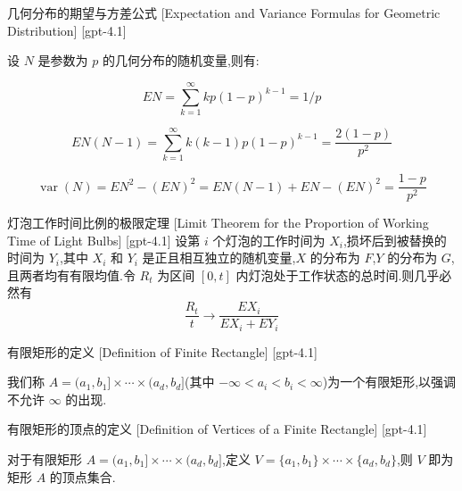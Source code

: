 \documentclass[UTF8]{ctexart}
\begin{document}
    \begin{ppt}
        {几何分布的期望与方差公式}
        [Expectation and Variance Formulas for Geometric Distribution]
        [gpt-4.1]
        
设 $N$ 是参数为 $p$ 的几何分布的随机变量,则有:

\[
E N = \sum_{k = 1}^{\infty} k p (1 - p)^{k - 1} = 1 / p
\]

\[
E N (N - 1) = \sum_{k = 1}^{\infty} k (k - 1) p (1 - p)^{k - 1} = \frac{2 (1 - p)}{p^{2}}
\]

\[
\operatorname{var}(N) = E N^{2} - (E N)^{2} = E N (N - 1) + E N - (E N)^{2} = \frac{1 - p}{p^{2}}
\]

    \end{ppt}
    
    
    
    \begin{thm}
        {灯泡工作时间比例的极限定理}
        [Limit Theorem for the Proportion of Working Time of Light Bulbs]
        [gpt-4.1]
        设第 $i$ 个灯泡的工作时间为 $X_i$,损坏后到被替换的时间为 $Y_i$,其中 $X_i$ 和 $Y_i$ 是正且相互独立的随机变量,$X$ 的分布为 $F$,$Y$ 的分布为 $G$,且两者均有有限均值.令 $R_t$ 为区间 $[0, t]$ 内灯泡处于工作状态的总时间.则几乎必然有
\[
\frac{R_t}{t} \to \frac{E X_i}{E X_i + E Y_i}
\]

    \end{thm}
    
    
    
    \begin{dfn}
        {有限矩形的定义}
        [Definition of Finite Rectangle]
        [gpt-4.1]
        
我们称 $A = (a_1, b_1] \times \cdots \times (a_d, b_d]$(其中 $-\infty < a_i < b_i < \infty$)为一个有限矩形,以强调不允许 $\infty$ 的出现.

    \end{dfn}
    
    
    
    \begin{dfn}
        {有限矩形的顶点的定义}
        [Definition of Vertices of a Finite Rectangle]
        [gpt-4.1]
        
对于有限矩形 $A = (a_1, b_1] \times \cdots \times (a_d, b_d]$,定义 $V = \{a_1, b_1\} \times \cdots \times \{a_d, b_d\}$,则 $V$ 即为矩形 $A$ 的顶点集合.

    \end{dfn}
    
\end{document}
